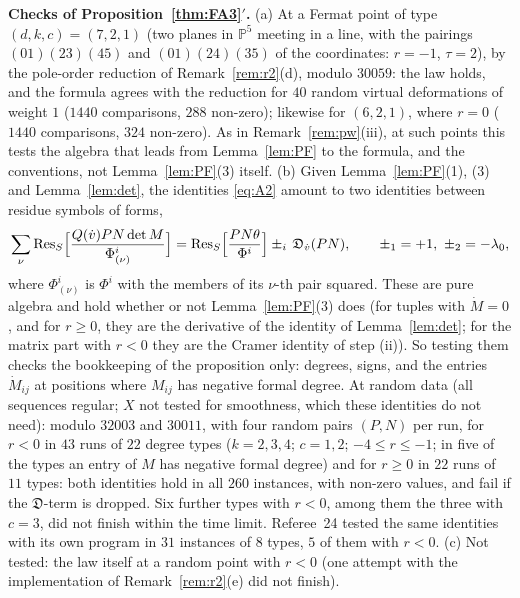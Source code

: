 \documentclass[11pt]{article}
\numberwithin{equation}{section}
\newcommand{\allr}{\ref{thm:FA3}$'$}
\theoremstyle{remark}
\newcommand{\PP}{\mathbb{P}}
\newcommand{\Res}{\operatorname{Res}}
\newcommand{\lz}{\lambda_0}
\newcommand{\run}[1]{\medskip\noindent\textbf{#1}}
\begin{document}
\run{Checks of Proposition~\allr.} (a) At a Fermat point of type $(d,k,c)=(7,2,1)$ (two planes in $\PP^5$ meeting in a line, with the pairings
$(01)(23)(45)$ and $(01)(24)(35)$ of the coordinates: $r=-1$, $\tau=2$), by
the pole-order reduction of Remark~\ref{rem:r2}(d), modulo $30059$: the law holds, and the formula agrees with
the reduction for $40$ random virtual deformations of weight $1$ ($1440$ comparisons, $288$ non-zero); likewise
for $(6,2,1)$, where $r=0$ ($1440$ comparisons, $324$ non-zero). As in Remark~\ref{rem:pw}(iii), at such points
this tests the algebra that leads from Lemma~\ref{lem:PF} to the formula, and the conventions, not
Lemma~\ref{lem:PF}(3) itself. (b) Given Lemma~\ref{lem:PF}(1), (3) and Lemma~\ref{lem:det}, the identities \eqref{eq:A2} amount to two
identities between residue symbols of forms,
\[
\sum_\nu\Res_S\Bigl[\frac{Q(\dot v)PN\det M}{\Phi^i_{(\nu)}}\Bigr]=\Res_S\Bigl[\frac{PN\theta}{\Phi^i}\Bigr]\pm_i\,\mathfrak D_{\dot v}(PN),
\qquad \pm_1=+1,\ \pm_2=-\lz,
\]
where $\Phi^i_{(\nu)}$ is $\Phi^i$ with the members of its $\nu$-th pair squared. These are pure algebra and hold whether or not Lemma~\ref{lem:PF}(3) does (for tuples with $\dot M=0$, and for
$r\ge0$, they are the derivative of the identity of Lemma~\ref{lem:det}; for the matrix part with $r<0$ they are
the Cramer identity of step (ii)). So testing them checks the bookkeeping of the proposition only: degrees,
signs, and the entries $\dot M_{ij}$ at positions where $M_{ij}$ has negative formal degree. At random data (all sequences regular; $X$ not tested for smoothness, which these identities do
not need): modulo $32003$ and $30011$, with four random pairs $(P,N)$ per run, for
$r<0$ in $43$ runs of $22$ degree types ($k=2,3,4$; $c=1,2$; $-4\le r\le-1$; in five of the types an entry of $M$ has
negative formal degree) and for $r\ge0$ in $22$ runs of $11$ types: both identities hold in all $260$ instances,
with non-zero values, and fail if the $\mathfrak D$-term is dropped. Six further types with $r<0$, among them the
three with $c=3$, did not finish within the time limit.
Referee~24 tested the same identities with its own program in $31$ instances of $8$ types, $5$ of them with
$r<0$. (c) Not tested: the law itself at a random point with $r<0$ (one attempt with the implementation of
Remark~\ref{rem:r2}(e) did not finish).
\end{document}

